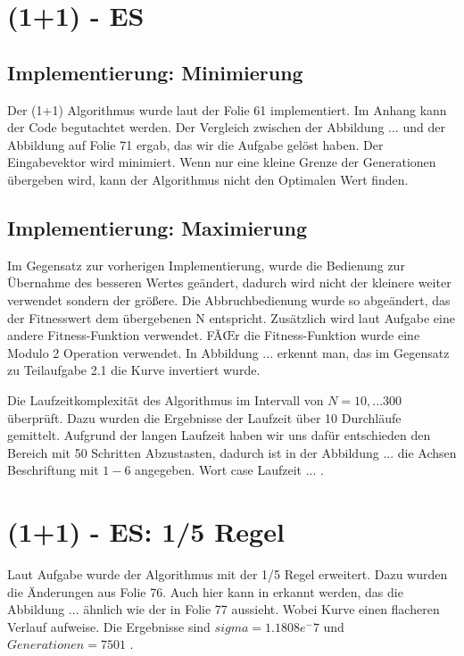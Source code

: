\chapter{(1+1) - ES}

\section{Implementierung: Minimierung}

Der (1+1) Algorithmus wurde laut der Folie 61 implementiert. Im Anhang kann der Code begutachtet werden. Der Vergleich zwischen der Abbildung  ... und der Abbildung auf Folie 71 ergab, das wir die Aufgabe gelöst haben. Der Eingabevektor wird minimiert. Wenn nur eine kleine Grenze der Generationen übergeben wird, kann der Algorithmus nicht den Optimalen Wert finden.


\section{Implementierung: Maximierung}

Im Gegensatz zur vorherigen Implementierung, wurde die Bedienung zur Übernahme des besseren Wertes geändert, dadurch wird nicht der kleinere weiter verwendet sondern der größere. Die Abbruchbedienung wurde so abgeändert, das der Fitnesswert dem übergebenen N entspricht. Zusätzlich wird laut Aufgabe eine andere Fitness-Funktion verwendet. FÃŒr die Fitness-Funktion wurde eine Modulo 2 Operation verwendet. In Abbildung  ... erkennt man, das im Gegensatz zu Teilaufgabe 2.1 die Kurve invertiert wurde.


Die Laufzeitkomplexität des Algorithmus im Intervall von $N=10,...300$ überprüft. Dazu wurden die Ergebnisse der Laufzeit über 10 Durchläufe gemittelt. Aufgrund der langen Laufzeit haben wir uns dafür entschieden den Bereich mit 50 Schritten Abzustasten, dadurch ist in der Abbildung  ... die Achsen Beschriftung mit $1-6$ angegeben. Wort case Laufzeit  ... .


\chapter{(1+1) - ES: 1/5 Regel}

Laut Aufgabe wurde der Algorithmus mit der 1/5 Regel erweitert. Dazu wurden die Änderungen aus Folie 76. Auch hier kann in erkannt werden, das die Abbildung  ... ähnlich wie der in Folie 77 aussieht. Wobei Kurve einen flacheren Verlauf aufweise. Die Ergebnisse sind $sigma = 1.1808e^-7$ und $Generationen = 7501$ .

